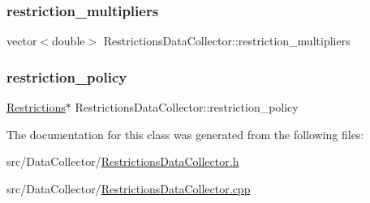 \subsubsection{\texorpdfstring{restriction\+\_\+multipliers}{restriction\_multipliers}}
{\footnotesize\ttfamily vector$<$double$>$ Restrictions\+Data\+Collector\+::restriction\+\_\+multipliers\hspace{0.3cm}{\ttfamily [private]}}

\mbox{\label{classRestrictionsDataCollector_a09e79e1e24fa4cc698c9dfa6914ee47d_a09e79e1e24fa4cc698c9dfa6914ee47d}} 
\subsubsection{\texorpdfstring{restriction\+\_\+policy}{restriction\_policy}}
{\footnotesize\ttfamily \mbox{\hyperlink{classRestrictions}{Restrictions}}$\ast$ Restrictions\+Data\+Collector\+::restriction\+\_\+policy\hspace{0.3cm}{\ttfamily [private]}}



The documentation for this class was generated from the following files\+:\begin{DoxyCompactItemize}
\item 
src/\+Data\+Collector/\mbox{\hyperlink{RestrictionsDataCollector_8h}{Restrictions\+Data\+Collector.\+h}}\item 
src/\+Data\+Collector/\mbox{\hyperlink{RestrictionsDataCollector_8cpp}{Restrictions\+Data\+Collector.\+cpp}}\end{DoxyCompactItemize}
